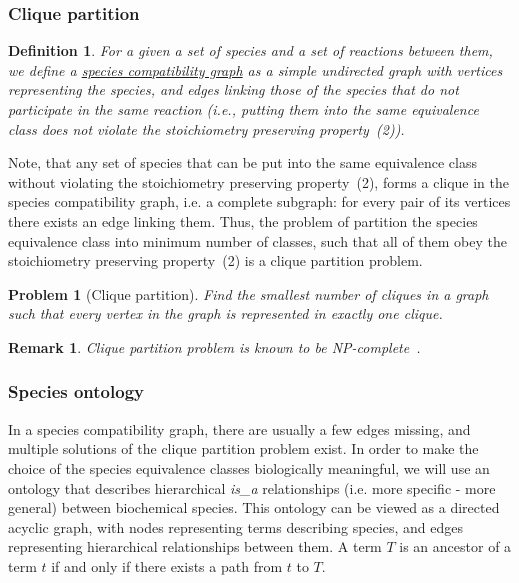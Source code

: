 \documentclass[10pt]{bmc_article}
\newenvironment{bmcformat}{\baselineskip20pt\sloppy\setboolean{publ}{false}}{\baselineskip20pt\sloppy}
\begin{document}
\begin{bmcformat}
\subsubsection*{Clique partition}
\newtheorem{scg}[def]{Definition}
\begin{scg}
For a given a set of species and a set of reactions between them, we define a \underline{species compatibility graph} as a simple undirected graph with vertices representing the species, and edges linking those of the species that do not participate in the same reaction (i.e., putting them into the same equivalence class does not violate the stoichiometry preserving property~(2)).
\end{scg}
Note, that any set of species that can be put into the same equivalence class without violating the stoichiometry preserving property~(2), forms a clique  in the species compatibility graph, i.e. a complete subgraph: for every pair of its vertices there exists an edge linking them. Thus, the problem of partition the species equivalence class into minimum number of classes, such that all of them obey the stoichiometry preserving property~(2) is a clique partition problem.
\newtheorem{clp}[pbm]{Problem}
\begin{clp}[Clique partition]
Find the smallest number of cliques in a graph such that every vertex in the graph is represented in exactly one clique.
\end{clp}
\newtheorem{rem0}[rm]{Remark}
\begin{rem0}
Clique partition problem is known to be \textit{NP}-complete~\cite{Bhasker1991}. 
\end{rem0}


\subsubsection*{Species ontology}
In a species compatibility graph, there are usually a few edges missing, and multiple solutions of the clique partition problem exist. In order to make the choice of the species equivalence classes biologically meaningful, we will use an ontology that describes hierarchical \textit{is\_a} relationships (i.e. more specific - more general) between biochemical species. This ontology can be viewed as a directed acyclic graph, with nodes representing terms describing species, and edges representing hierarchical relationships between them. A term $T$ is an ancestor of a term $t$ if and only if there exists a path from $t$ to $T$. 


\end{bmcformat}
\end{document}

